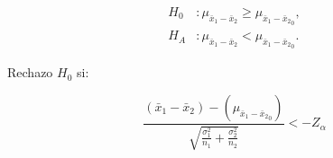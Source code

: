 		\begin{minipage}[b]{\textwidth}
    \begin{minipage}[c]{0.3 \textwidth}\item
    	\begin{align*}
    	H_0&: \mu _{ \bar { x } _{ 1 }-\bar { x } _{ 2 }} \ge \mu _{ \bar { x } _{ 1 }-\bar { x } _{ 2 }}_0,\\
    	H_A&: \mu _{ \bar { x } _{ 1 }-\bar { x } _{ 2 }} < \mu _{ \bar { x } _{ 1 }-\bar { x } _{ 2 }}_0.    	
    	\end{align*}\end{minipage} \hfill
    \begin{minipage}[c]{0.3 \textwidth}\item
				Rechazo $H_0$ si:		
		\end{minipage} \hfill
    \begin{minipage}[c]{0.3 \textwidth}\item
	 $$\frac {( \bar{x}_1-\bar{x}_2)-(\mu _{ \bar { x } _{ 1 }-\bar { x } _{ 2 }}_0 )}{\sqrt{\frac { \sigma^ 2_1 }{n_1} +\frac { \sigma^ 2_2 }{n_2}}  }< -Z_{\alpha}$$
    \end{minipage}
    \end{minipage}